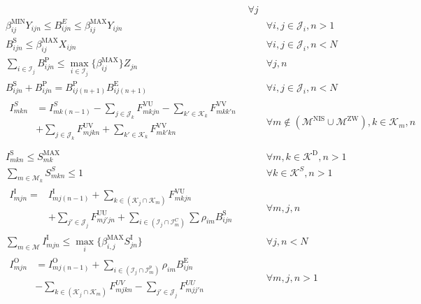 \begin{align}
\begin{aligned}
\end{aligned} && \forall j \\
	& \beta_{ij}^\text{MIN} Y_{ijn} \le B_{ijn}^E  \le \beta_{ij}^\text{MAX} Y_{ijn} && \forall i, j \in \mathcal{J}_i, n > 1 \\
	& B_{ijn}^{\text{S}} \le \beta_{ij}^{\text{MAX}} X_{ijn} && \forall i, j \in \mathcal{J}_i, n < N \\
	& \sum_{i \in \mathcal{I}_j} B_{ijn}^{\text{P}} \le \max_{i \in \mathcal{I}_j} \{ \beta_{ij}^{\text{MAX}}\} Z_{jn} && \forall j, n \\
	& B_{ijn}^\text{S} + B_{ijn}^\text{P} = B_{ij(n+1)}^\text{P} B_{ij(n+1)}^\text{E} && \forall i, j \in \mathcal{J}_i, n < N \\
&\begin{aligned}
I_{mkn}^S &= I_{mk(n-1)}^S - \sum_{j \in \mathcal{J}_k} F_{mkjn}^{\text{VU}} - \sum_{k' \in \mathcal{K}_k} F_{mkk'n}^{\text{VV}}   \\ &+ \sum_{j \in \mathcal{J}_k} F_{mjkn}^{\text{UV}} + \sum_{k' \in \mathcal{K}_k} F_{mk'kn}^{\text{VV}} \\
\end{aligned} && \forall m \notin (\mathcal{M}^{\text{NIS}} \cup \mathcal{M}^\text{ZW}), k \in \mathcal{K}_m , n \\
	& I_{mkn}^\text{S} \le S_{mk}^{\text{MAX}} && \forall m, k \in \mathcal{K}^\text{D}, n>1 \\
	& \sum_{m \in \mathcal{M}_k} S_{mkn}^{S} \le 1 && \forall k \in \mathcal{K}^S, n > 1 \\
&\begin{aligned}
I_{mjn}^\text{I} = &I_{mj(n-1)}^{\text{I}} + \sum_{k \in (\mathcal{K}_j \cap \mathcal{K}_m)} F_{mkjn}^{\text{VU}}  \\ &+  \sum_{j' \in \mathcal{J}_j} F_{mj'jn}^{\text{UU}} + \sum_{i \in (\mathcal{I}_j \cap \mathcal{I}_m^C)} \sum \rho_{im} B_{ijn}^\text{S}
\end{aligned} && \forall m, j, n \\
& \sum_{m \in \mathcal{M}} I^{\text{I}}_{mjn} \le \max_i \{\beta_{i,j}^{\text{MAX}} S_{jn}^{\text{I}} \} && \forall j, n < N \\
&\begin{aligned}
I_{mjn}^\text{O} &= I_{mj(n-1)}^\text{O} + \sum_{i \in (\mathcal{I}_j \cap \mathcal{I}_m^p)} \rho_{im} B_{ijn}^\text{E}  \\ &- \sum_{k \in (\mathcal{K}_j \cap \mathcal{K}_m)} F^{UV}_{mjkn} - \sum_{j' \in \mathcal{J}_j} F^{UU}_{mjj'n}
\end{aligned}  &&\forall m, j , n > 1 \\

\end{align}

